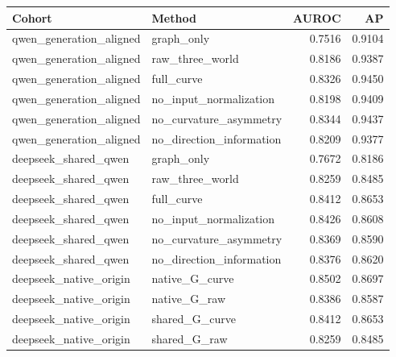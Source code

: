 \begin{tabular}{llrr}
\hline
Cohort & Method & AUROC & AP \\
\hline
qwen\_generation\_aligned & graph\_only & 0.7516 & 0.9104 \\
qwen\_generation\_aligned & raw\_three\_world & 0.8186 & 0.9387 \\
qwen\_generation\_aligned & full\_curve & 0.8326 & 0.9450 \\
qwen\_generation\_aligned & no\_input\_normalization & 0.8198 & 0.9409 \\
qwen\_generation\_aligned & no\_curvature\_asymmetry & 0.8344 & 0.9437 \\
qwen\_generation\_aligned & no\_direction\_information & 0.8209 & 0.9377 \\
deepseek\_shared\_qwen & graph\_only & 0.7672 & 0.8186 \\
deepseek\_shared\_qwen & raw\_three\_world & 0.8259 & 0.8485 \\
deepseek\_shared\_qwen & full\_curve & 0.8412 & 0.8653 \\
deepseek\_shared\_qwen & no\_input\_normalization & 0.8426 & 0.8608 \\
deepseek\_shared\_qwen & no\_curvature\_asymmetry & 0.8369 & 0.8590 \\
deepseek\_shared\_qwen & no\_direction\_information & 0.8376 & 0.8620 \\
deepseek\_native\_origin & native\_G\_curve & 0.8502 & 0.8697 \\
deepseek\_native\_origin & native\_G\_raw & 0.8386 & 0.8587 \\
deepseek\_native\_origin & shared\_G\_curve & 0.8412 & 0.8653 \\
deepseek\_native\_origin & shared\_G\_raw & 0.8259 & 0.8485 \\
\hline
\end{tabular}
